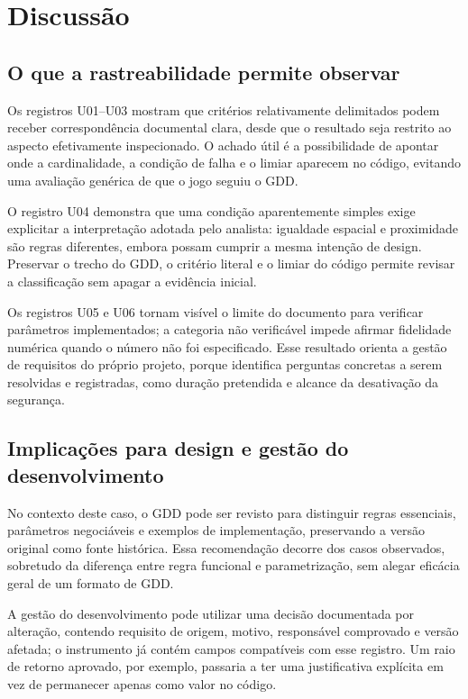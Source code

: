 \section{Discussão}
\subsection{O que a rastreabilidade permite observar}
Os registros U01--U03 mostram que critérios relativamente delimitados podem receber correspondência documental clara, desde que o resultado seja restrito ao aspecto efetivamente inspecionado. O achado útil é a possibilidade de apontar onde a cardinalidade, a condição de falha e o limiar aparecem no código, evitando uma avaliação genérica de que o jogo seguiu o GDD.

O registro U04 demonstra que uma condição aparentemente simples exige explicitar a interpretação adotada pelo analista: igualdade espacial e proximidade são regras diferentes, embora possam cumprir a mesma intenção de design. Preservar o trecho do GDD, o critério literal e o limiar do código permite revisar a classificação sem apagar a evidência inicial.

Os registros U05 e U06 tornam visível o limite do documento para verificar parâmetros implementados; a categoria não verificável impede afirmar fidelidade numérica quando o número não foi especificado. Esse resultado orienta a gestão de requisitos do próprio projeto, porque identifica perguntas concretas a serem resolvidas e registradas, como duração pretendida e alcance da desativação da segurança.

\subsection{Implicações para design e gestão do desenvolvimento}
No contexto deste caso, o GDD pode ser revisto para distinguir regras essenciais, parâmetros negociáveis e exemplos de implementação, preservando a versão original como fonte histórica. Essa recomendação decorre dos casos observados, sobretudo da diferença entre regra funcional e parametrização, sem alegar eficácia geral de um formato de GDD.

A gestão do desenvolvimento pode utilizar uma decisão documentada por alteração, contendo requisito de origem, motivo, responsável comprovado e versão afetada; o instrumento já contém campos compatíveis com esse registro. Um raio de retorno aprovado, por exemplo, passaria a ter uma justificativa explícita em vez de permanecer apenas como valor no código.

